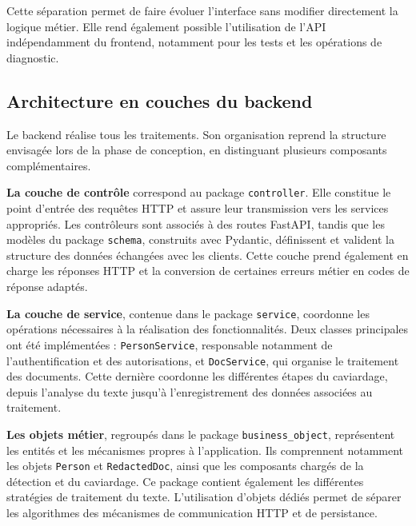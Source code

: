 \documentclass[12pt,a4paper]{article}
\begin{document}
Cette séparation permet de faire évoluer l'interface sans modifier directement la logique métier. Elle rend également possible l'utilisation de l'API indépendamment du frontend, notamment pour les tests et les opérations de diagnostic.



\subsection{Architecture en couches du backend}

Le backend réalise tous les traitements. Son organisation reprend la structure envisagée lors de la phase de conception, en distinguant plusieurs composants complémentaires.

\medskip

\noindent
\textbf{La couche de contrôle} correspond au package \texttt{controller}. Elle constitue le point d'entrée des requêtes HTTP et assure leur transmission vers les services appropriés. Les contrôleurs sont associés à des routes FastAPI, tandis que les modèles du package \texttt{schema}, construits avec Pydantic, définissent et valident la structure des données échangées avec les clients. Cette couche prend également en charge les réponses HTTP et la conversion de certaines erreurs métier en codes de réponse adaptés.

\medskip

\noindent
\textbf{La couche de service}, contenue dans le package \texttt{service}, coordonne les opérations nécessaires à la réalisation des fonctionnalités. Deux classes principales ont été implémentées : \texttt{PersonService}, responsable notamment de l'authentification et des autorisations, et \texttt{DocService}, qui organise le traitement des documents. Cette dernière coordonne les différentes étapes du caviardage, depuis l'analyse du texte jusqu'à l'enregistrement des données associées au traitement.

\medskip

\noindent
\textbf{Les objets métier}, regroupés dans le package \texttt{business\_object}, représentent les entités et les mécanismes propres à l'application. Ils comprennent notamment les objets \texttt{Person} et \texttt{RedactedDoc}, ainsi que les composants chargés de la détection et du caviardage. Ce package contient également les différentes stratégies de traitement du texte. L'utilisation d'objets dédiés permet de séparer les algorithmes des mécanismes de communication HTTP et de persistance.
\end{document}
